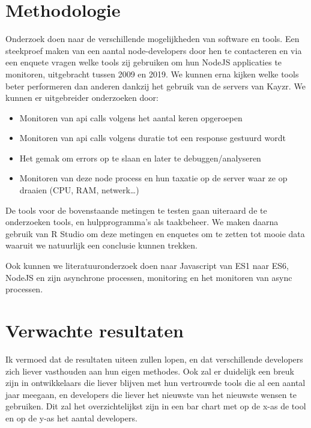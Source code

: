 \section{Methodologie}
\label{sec:methodologie}

Onderzoek doen naar de verschillende mogelijkheden van software en tools. Een steekproef maken van een aantal node-developers door hen te contacteren en via een enquete vragen welke tools zij gebruiken om hun NodeJS applicaties te monitoren, uitgebracht tussen 2009 en 2019. We kunnen erna kijken welke tools beter performeren dan anderen dankzij het gebruik van de servers van Kayzr. We kunnen er uitgebreider onderzoeken door:

\begin{itemize}
	\item Monitoren van api calls volgens het aantal keren opgeroepen
	\item Monitoren van api calls volgens duratie tot een response gestuurd wordt
	\item Het gemak om errors op te slaan en later te debuggen/analyseren
	\item Monitoren van deze node process en hun taxatie op de server waar ze op draaien (CPU, RAM, netwerk…)
\end{itemize}

De tools voor de bovenstaande metingen te testen gaan uiteraard de te onderzoeken tools, en hulpprogramma's als taakbeheer. We maken daarna gebruik van R Studio om deze metingen en enquetes om te zetten tot mooie data waaruit we natuurlijk een conclusie kunnen trekken. 

Ook kunnen we literatuuronderzoek doen naar Javascript van ES1 naar ES6, NodeJS en zijn asynchrone processen, monitoring en het monitoren van async processen. 

\section{Verwachte resultaten}
\label{sec:verwachte_resultaten}

Ik vermoed dat de resultaten uiteen zullen lopen, en dat verschillende developers zich liever vasthouden aan hun eigen methodes. Ook zal er duidelijk een breuk zijn in ontwikkelaars die liever blijven met hun vertrouwde tools die al een aantal jaar meegaan, en developers die liever het nieuwste van het nieuwste wensen te gebruiken. Dit zal het overzichtelijkst zijn in een bar chart met op de x-as de tool en op de y-as het aantal developers.

